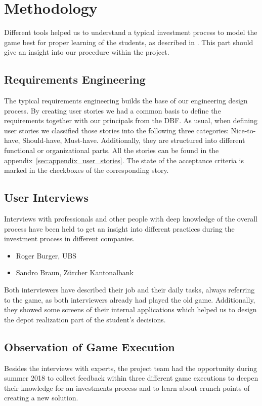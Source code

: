 \section{Methodology}
\label{sec:methodology}

Different tools helped us to understand a typical investment process to model the game best for proper learning of the students, as described in . This part should give an insight into our procedure within the project.

\subsection{Requirements Engineering}
The typical requirements engineering builds the base of our engineering design process. By creating user stories we had a common basis to define the requirements together with our principals from the DBF. As usual, when defining user stories we classified those stories into the following three categories: Nice-to-have, Should-have, Must-have. Additionally, they are structured into different functional or organizational parts. All the stories can be found in the appendix~\ref{sec:appendix_user_stories}. The state of the acceptance criteria is marked in the checkboxes of the corresponding story.

\subsection{User Interviews}
Interviews with professionals and other people with deep knowledge of the overall process have been held to get an insight into different practices during the investment process in different companies.
\begin{itemize}
  \item Roger Burger, UBS
  \item Sandro Braun, Zürcher Kantonalbank
\end{itemize}

Both interviewers have described their job and their daily tasks, always referring to the game, as both interviewers already had played the old game. Additionally, they showed some screens of their internal applications which helped us to design the depot realization part of the student's decisions.

\subsection{Observation of Game Execution}
Besides the interviews with experts, the project team had the opportunity during summer 2018 to collect feedback within three different game executions to deepen their knowledge for an investments process and to learn about crunch points of creating a new solution. \\

